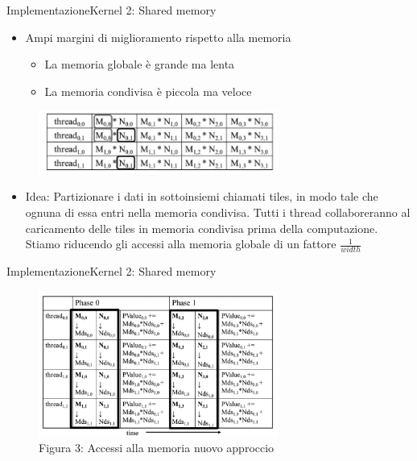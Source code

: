 \documentclass{beamer}
\begin{document}
\begin{frame}{Implementazione}{Kernel 2: Shared memory}
    \begin{itemize}
        \item Ampi margini di miglioramento rispetto alla memoria
              \begin{itemize}
                  \item La memoria globale è grande ma lenta
                  \item La memoria condivisa è piccola ma veloce
              \end{itemize}
    \end{itemize}
    \begin{figure}[H]
        \centering
        \includegraphics[width=0.7\textwidth]{imgs/memory_access.png}
    \end{figure}
    \begin{itemize}
        \item Idea: Partizionare i dati in sottoinsiemi chiamati tiles, in modo tale che ognuna di essa entri nella memoria condivisa. Tutti i thread collaboreranno al caricamento delle tiles in memoria condivisa prima della computazione. Stiamo riducendo gli accessi alla memoria globale di un fattore $\frac{1}{width}$
    \end{itemize}
\end{frame}

\begin{frame}{Implementazione}{Kernel 2: Shared memory}
    \begin{figure}[H]
        \centering
        \includegraphics[width=0.7\textwidth]{imgs/memory_access1.png}
        \caption{Figura 3: Accessi alla memoria nuovo approccio}
    \end{figure}
\end{frame}
\end{document}
